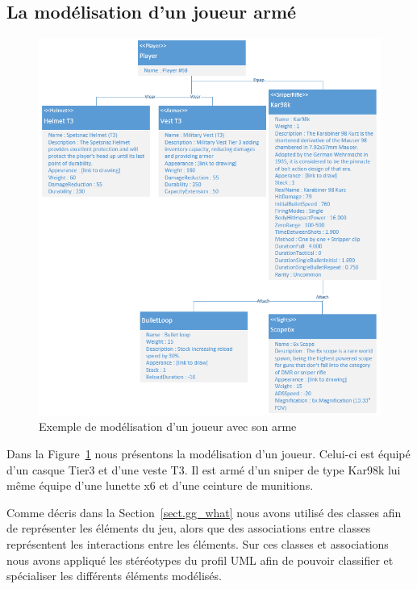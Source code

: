 \subsection{La modélisation d'un joueur armé}

\begin{figure}[H]
    \centering
    \includegraphics[width=14cm]{10_img/chap6/player68.PNG} 
    \caption{Exemple de modélisation d'un joueur avec son arme}
    \label{fig.player+weapon+equip}
\end{figure}

Dans la Figure~\ref{fig.player+weapon+equip} nous présentons la modélisation d'un joueur.
Celui-ci est équipé d'un casque Tier3 et d'une veste T3. 
Il est armé d'un sniper de type Kar98k lui même équipe d'une lunette x6 et d'une ceinture de munitions.

Comme décris dans la Section~\ref{sect.gg_what} nous avons utilisé des classes afin de représenter les éléments du jeu, alors que des associations entre classes représentent les interactions entre les éléments.
Sur ces classes et associations nous avons appliqué les stéréotypes du profil UML afin de pouvoir classifier et spécialiser les différents éléments modélisés.



